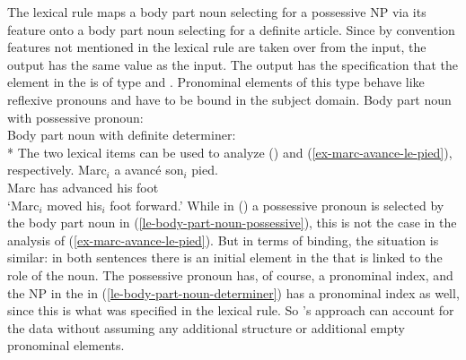 \documentclass[output=paper,biblatex,babelshorthands,newtxmath,draftmode,colorlinks,citecolor=brown]{langscibook}
\begin{document}
\largerpage
\noindent
The lexical rule maps a body part noun selecting for a possessive NP  via its \spr feature onto a
body part noun selecting for a definite article. Since by convention features not mentioned in the
lexical rule are taken over from the input, the output has the same \cont value as the input. The
output has the specification that the element in the \argst is of type  and
. Pronominal elements of this type behave like reflexive pronouns and have to be bound
in the subject domain.
\eal
\ex 
\label{le-body-part-noun-possessive}
Body part noun with possessive pronoun:\\
\ex 
\label{le-body-part-noun-determiner}
Body part noun with definite determiner:\\*
\zl 
\largerpage
The two lexical items can be used to analyze () and (\ref{ex-marc-avance-le-pied}), respectively.
\ea
\gll Marc$_i$ a   avancé   son$_i$ pied.\\
     Marc     has advanced his     foot\\
\glt `Marc$_i$ moved his$_i$ foot forward.'
\z
While in () a possessive pronoun is selected by the body part noun in
(\ref{le-body-part-noun-possessive}), this is not the case in the analysis of
(\ref{ex-marc-avance-le-pied}). But in terms of binding, the situation is similar: in both sentences
there is an initial element in the \argst that is linked to the  role of the
noun. The possessive pronoun has, of course, a pronominal index, and the NP in the \argst in
(\ref{le-body-part-noun-determiner}) has a pronominal index as well, since this is what was
specified in the lexical rule. So \citeauthor{Koenig1999b}'s approach can account for the data
without assuming any additional structure or additional empty pronominal elements.
\end{document}
